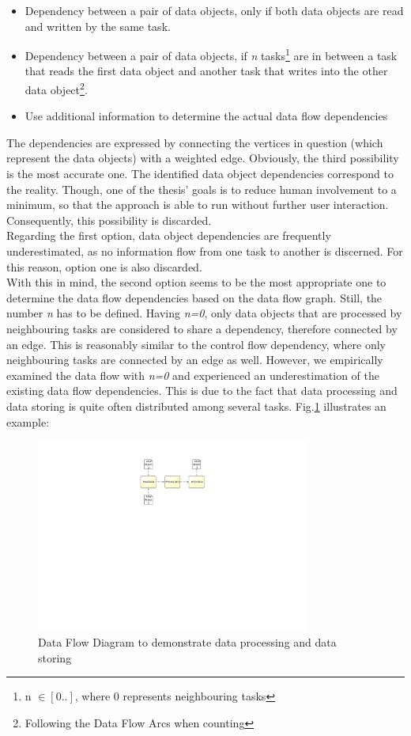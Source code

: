 \begin{itemize}
	\item Dependency between a pair of data objects, only if both data objects are read and written by the same task.
	\item Dependency between a pair of data objects, if \textit{n} tasks\footnote{n $\in [0..]$, where 0 represents neighbouring tasks} are in between a task that reads the first data object and another task that writes into the other data object\footnote{Following the Data Flow Arcs when counting}.
	

	
	\item Use additional information to determine the actual data flow dependencies
\end{itemize}
\noindent
The dependencies are expressed by connecting the vertices in question (which represent the data objects) with a weighted edge. 
Obviously, the third possibility is the most accurate one. The identified data object dependencies correspond to the reality. Though, one of the thesis' goals is to reduce human involvement to a minimum, so that the approach is able to run without further user interaction. Consequently, this possibility is discarded. \\
Regarding the first option, data object dependencies are frequently underestimated, as no information flow from one task to another is discerned. For this reason, option one is also discarded. \\
With this in mind, the second option seems to be the most appropriate one to determine the data flow dependencies based on the data flow graph. Still, the number \textit{n} has to be defined. Having \textit{n=0}, only data objects that are processed by neighbouring tasks are considered to share a dependency, therefore connected by an edge. This is reasonably similar to the control flow dependency, where only neighbouring tasks are connected by an edge as well. However, we empirically examined the data flow with \textit{n=0} and experienced an underestimation of the existing data flow dependencies. This is due to the fact that data processing and data storing is quite often distributed among several tasks. Fig.\ref{fig:ExampleDataProcessing} illustrates an example: 


\begin{figure}[h!]
	\centering
	\includegraphics[width=9cm, trim={10cm 14.3cm 10cm 2.2cm}]{img/ProcessDataDFD.pdf}
	\caption{Data Flow Diagram to demonstrate data processing and data storing}
	\label{fig:ExampleDataProcessing}
\end{figure}

